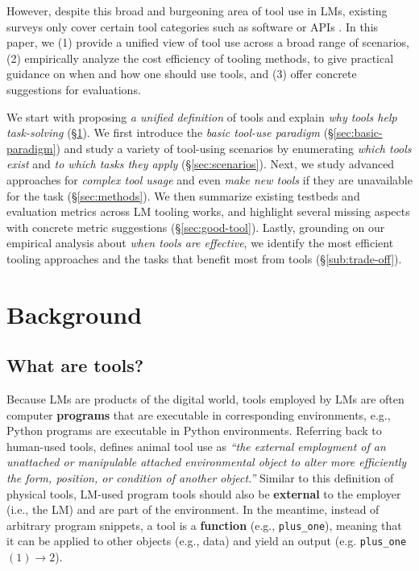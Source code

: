 However, despite this broad and burgeoning area of tool use in LMs, existing surveys only cover certain tool categories such as software \citep{mialon2023augmented} or APIs \citep{qin2023tool}. 
In this paper, we (1) provide a unified view of tool use across a broad range of scenarios, (2) empirically analyze the cost efficiency of tooling methods, to give practical guidance on when and how one should use tools, and (3) offer concrete suggestions for evaluations.

We start with proposing \textit{a unified definition} of tools and explain \textit{why tools help task-solving} (\S\ref{sec:background}).
We first introduce the \emph{basic tool-use paradigm} (\S\ref{sec:basic-paradigm}) and study a variety of tool-using scenarios by enumerating \textit{which tools exist} and \textit{to which tasks they apply} (\S\ref{sec:scenarios}). 
Next, we study advanced approaches for \textit{complex tool usage} and even \textit{make new tools} if they are unavailable for the task (\S\ref{sec:methods}). 
We then summarize existing testbeds and evaluation metrics across LM tooling works, and highlight several missing aspects with concrete metric suggestions (\S\ref{sec:good-tool}).
Lastly, grounding on our empirical analysis about \textit{when tools are effective}, we identify the most efficient tooling approaches and the tasks that benefit most from tools (\S\ref{sub:trade-off}). 



\section{Background}
\label{sec:background}

\subsection{What are tools?}
Because LMs are products of the digital world, tools employed by LMs are often computer \textbf{programs} that are executable in corresponding environments, e.g., Python programs are executable in Python environments. 
Referring back to human-used tools, \citet{shumaker2011animal} defines animal tool use as \textit{``the external employment of an unattached or manipulable attached environmental object to alter more efficiently the form, position, or condition of another object.''}
Similar to this definition of physical tools, LM-used program tools should also be \textbf{external} to the employer (i.e., the LM) and are part of the environment. 
In the meantime, instead of arbitrary program snippets, a tool is a \textbf{function} (e.g., \texttt{plus\_one}), meaning that it can be applied to other objects (e.g., data) and yield an output (e.g. \texttt{plus\_one}$(1) \rightarrow 2$).

